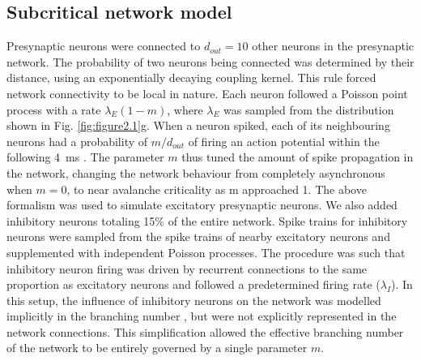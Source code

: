 \subsection{Subcritical network model}
Presynaptic neurons were connected to $d_{out}=10$ other neurons in the presynaptic network. The probability of two neurons being connected was determined by their distance, using an exponentially decaying coupling kernel. This rule forced network connectivity to be local in nature. Each neuron followed a Poisson point process with a rate $\lambda_E (1-m)$, where $\lambda_E$ was sampled from the distribution shown in Fig. \ref{fig:figure2.1}g. When a neuron spiked, each of its neighbouring neurons had a probability of $m/d_{out}$ of firing an action potential within the following \qty{4}{\milli\second} \cite{Wilting2019}. The parameter $m$ thus tuned the amount of spike propagation in the network, changing the network behaviour from completely asynchronous when $m=0$, to near avalanche criticality as m approached 1. The above formalism was used to simulate excitatory presynaptic neurons. We also added inhibitory neurons totaling 15\% of the entire network. Spike trains for inhibitory neurons were sampled from the spike trains of nearby excitatory neurons and supplemented with independent Poisson processes. The procedure was such that inhibitory neuron firing was driven by recurrent connections to the same proportion as excitatory neurons and followed a predetermined firing rate ($\lambda_I$). In this setup, the influence of inhibitory neurons on the network was modelled implicitly in the branching number \cite{Li2020}, but were not explicitly represented in the network connections. This simplification allowed the effective branching number of the network to be entirely governed by a single parameter $m$. 


